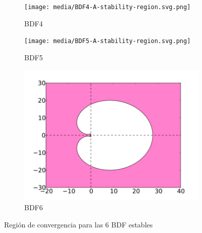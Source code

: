\begin{figure}[h]
    \begin{subfigure}{0.3\textwidth}
        \centering
        \texttt{[image: media/BDF4-A-stability-region.svg.png]}
        \caption{BDF4}
    \end{subfigure}
    \begin{subfigure}{0.3\textwidth}
        \centering
        \texttt{[image: media/BDF5-A-stability-region.svg.png]}
        \caption{BDF5}
    \end{subfigure}
    \begin{subfigure}{0.3\textwidth}
        \centering
        \includegraphics[width=\textwidth]{media/BDF6-A-stability-region.svg.png}
        \caption{BDF6}
    \end{subfigure}
    \caption{Región de convergencia para las $6$ BDF estables}
\end{figure}

